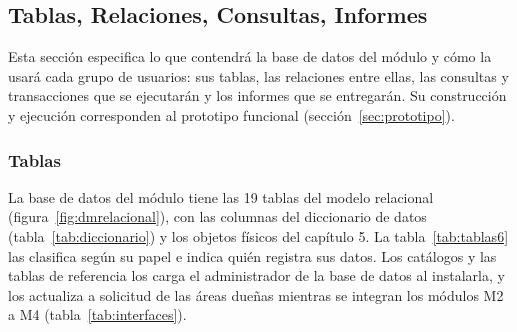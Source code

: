\subsection{Tablas, Relaciones, Consultas, Informes}

Esta sección especifica lo que contendrá la base de datos del módulo y
cómo la usará cada grupo de usuarios: sus tablas, las relaciones entre
ellas, las consultas y transacciones que se ejecutarán y los informes
que se entregarán. Su construcción y ejecución corresponden al
prototipo funcional (sección~\ref{sec:prototipo}).

\subsubsection{Tablas}

La base de datos del módulo tiene las 19 tablas del modelo relacional
(figura~\ref{fig:dmrelacional}), con las columnas del diccionario de
datos (tabla~\ref{tab:diccionario}) y los objetos físicos del
capítulo 5. La tabla~\ref{tab:tablas6} las clasifica según su papel e
indica quién registra sus datos. Los catálogos y las tablas de
referencia los carga el administrador de la base de datos al
instalarla, y los actualiza a solicitud de las áreas dueñas mientras se
integran los módulos M2 a M4 (tabla~\ref{tab:interfaces}).

